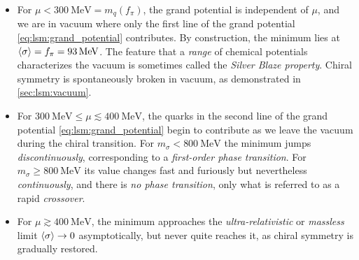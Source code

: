 \begin{itemize}
\item For $\mu < \SI{300}{\mega\electronvolt} = m_q(f_\pi)$,
      the grand potential is independent of $\mu$,
      and we are in vacuum where only the first line of the grand potential \eqref{eq:lsm:grand_potential} contributes.
      By construction, the minimum lies at $\langle \sigma \rangle = f_\pi = \SI{93}{\mega\electronvolt}$.
      The feature that a \emph{range} of chemical potentials characterizes the vacuum is sometimes called the \emph{Silver Blaze property}.
      Chiral symmetry is spontaneously broken in vacuum, as demonstrated in \cref{sec:lsm:vacuum}.
\item For $\SI{300}{\mega\electronvolt} \leq \mu \lesssim \SI{400}{\mega\electronvolt}$,
      the quarks in the second line of the grand potential \eqref{eq:lsm:grand_potential} begin to contribute as we leave the vacuum during the chiral transition.
      For $m_\sigma <    \SI{800}{\mega\electronvolt}$ the minimum jumps \emph{discontinuously}, corresponding to a \emph{first-order phase transition}.
      For $m_\sigma \geq \SI{800}{\mega\electronvolt}$ its value changes fast and furiously but nevertheless \emph{continuously},
      and there is \emph{no phase transition}, only what is referred to as a rapid \emph{crossover}.
\item For $\mu \gtrsim \SI{400}{\mega\electronvolt}$,
      the minimum approaches the \emph{ultra-relativistic} or \emph{massless} limit $\langle \sigma \rangle \rightarrow 0$ asymptotically,
      but never quite reaches it,
      as chiral symmetry is gradually restored.
\end{itemize}

